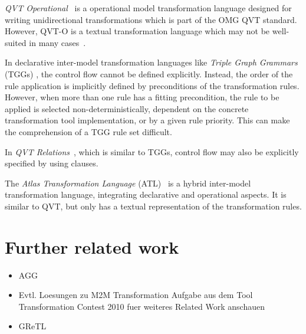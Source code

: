 \emph{QVT Operational}~\cite{QVT} is a operational model transformation language designed for writing unidirectional transformations which is part of the OMG QVT standard. %
However, QVT-O is a textual transformation language which may not be well-suited in many cases~\cite{Moo09}.

In declarative inter-model transformation languages like \emph{Triple Graph Grammars} (TGGs) \cite{Sch94}, the control flow cannot be defined explicitly.
Instead, the order of the rule application is implicitly defined by preconditions of the transformation rules.
However, when more than one rule has a fitting precondition, the rule to be applied is selected non-deterministically, dependent on the concrete transformation tool implementation, or by a given rule priority.
This can make the comprehension of a TGG rule set difficult.

In \emph{QVT Relations}~\cite{QVT}, which is similar to TGGs, control flow may also be explicitly specified by using  clauses.

The \emph{Atlas Transformation Language} (ATL)~\cite{ATL} is a hybrid inter-model transformation language, integrating declarative and operational aspects.
It is similar to QVT, but only has a textual representation of the transformation rules.

\section*{Further related work}

\begin{itemize}
\item AGG
\item Evtl. Loesungen zu M2M Transformation Aufgabe aus dem Tool Transformation Contest 2010 fuer weiteres Related Work anschauen
\item GReTL \cite{HE11}
\end{itemize}